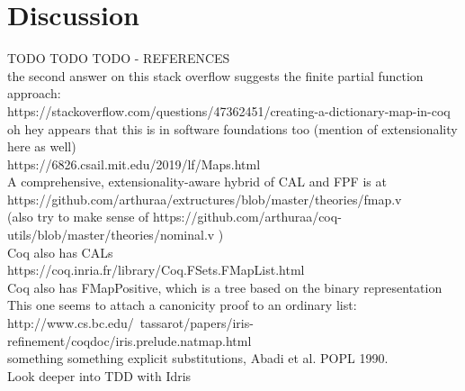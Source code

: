 \section{Discussion}
\label{sec:Discussion}
TODO TODO TODO - REFERENCES
\\
the second answer on this stack overflow suggests the finite partial function approach:
\\
https://stackoverflow.com/questions/47362451/creating-a-dictionary-map-in-coq
\\
oh hey appears that this is in software foundations too (mention of extensionality here as well)
\\
https://6826.csail.mit.edu/2019/lf/Maps.html
\\
A comprehensive, extensionality-aware hybrid of CAL and FPF is at
\\
https://github.com/arthuraa/extructures/blob/master/theories/fmap.v
\\
(also try to make sense of https://github.com/arthuraa/coq-utils/blob/master/theories/nominal.v )
\\
Coq also has CALs
\\
https://coq.inria.fr/library/Coq.FSets.FMapList.html
\\
Coq also has FMapPositive, which is a tree based on the binary representation
\\
This one seems to attach a canonicity proof to an ordinary list:
\\
http://www.cs.bc.edu/~tassarot/papers/iris-refinement/coqdoc/iris.prelude.natmap.html
\\
something something explicit substitutions, Abadi et al. POPL 1990.
\\
Look deeper into TDD with Idris

\citep{HazelnutPOPL}
